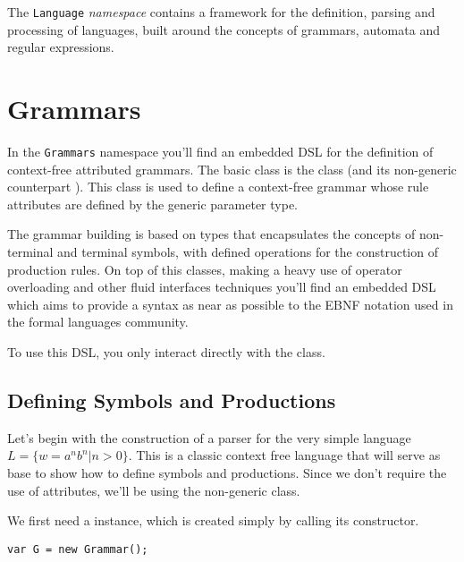 The \texttt{Language} \emph{namespace} contains a framework
for the definition, parsing and processing of languages,
built around the concepts of grammars, automata and regular expressions.

\section{Grammars}

In the \texttt{Grammars} namespace you'll find an embedded DSL for
the definition of context-free attributed grammars. The basic class
is the 
class (and its non-generic counterpart ).
This class is used to define a context-free grammar whose rule attributes
are defined by the generic parameter type.  

The grammar building is based on types that encapsulates the concepts
of non-terminal and terminal symbols, with defined operations for
the construction of production rules. On top of this classes, making
a heavy use of operator overloading and other fluid interfaces techniques
you'll find an embedded DSL which aims to provide a syntax as near as
possible to the EBNF notation used in the formal languages community.

To use this DSL, you only interact directly with the 
 class.

\subsection{Defining Symbols and Productions}

Let's begin with the construction of a parser for the very simple language
$L = \{ w = a^n b^n | n > 0 \}$. This is a classic context free language 
that will serve as base to show how to define symbols and productions.
Since we don't require the use of attributes, we'll be using the non-generic
 class.

We first need a  instance,
which is created simply by calling its constructor.

\begin{verbatim}
var G = new Grammar();
\end{verbatim}


